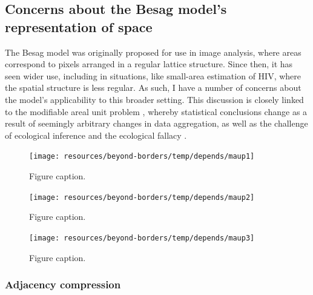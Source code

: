 \documentclass[a4paper, nobind]{templates/ociamthesis}
\begin{document}
\hypertarget{concerns-about-the-besag-models-representation-of-space}{%
\subsection{Concerns about the Besag model's representation of space}\label{concerns-about-the-besag-models-representation-of-space}}

The Besag model was originally proposed for use in image analysis, where areas correspond to pixels arranged in a regular lattice structure.
Since then, it has seen wider use, including in situations, like small-area estimation of HIV, where the spatial structure is less regular.
As such, I have a number of concerns about the model's applicability to this broader setting.
This discussion is closely linked to the modifiable areal unit problem \autocite{openshow1979million}, whereby statistical conclusions change as a result of seemingly arbitrary changes in data aggregation, as well as the challenge of ecological inference and the ecological fallacy \autocite{wakefield2010aggregation}.



\begin{figure}

{\centering \texttt{[image: resources/beyond-borders/temp/depends/maup1]} 

}

\caption{Figure caption.}\label{fig:maup1}
\end{figure}



\begin{figure}

{\centering \texttt{[image: resources/beyond-borders/temp/depends/maup2]} 

}

\caption{Figure caption.}\label{fig:maup2}
\end{figure}



\begin{figure}

{\centering \texttt{[image: resources/beyond-borders/temp/depends/maup3]} 

}

\caption{Figure caption.}\label{fig:maup3}
\end{figure}

\hypertarget{adjacency-compression}{%
\subsubsection{Adjacency compression}\label{adjacency-compression}}
\end{document}
